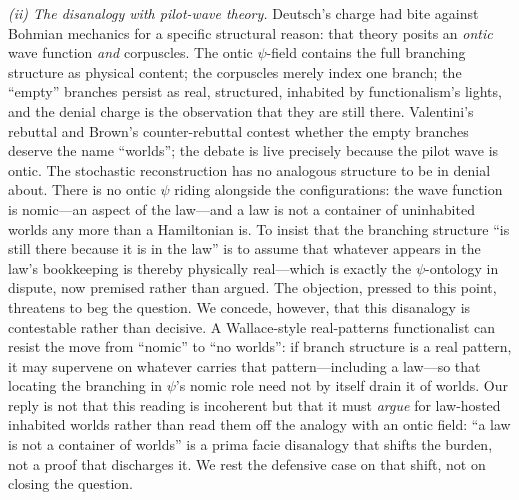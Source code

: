 \documentclass[11pt]{article}
\theoremstyle{remark}
\begin{document}
\emph{(ii) The disanalogy with pilot-wave theory.} Deutsch's charge
had bite against Bohmian mechanics for a specific structural reason:
that theory posits an \emph{ontic} wave function \emph{and}
corpuscles. The ontic $\psi$-field contains the full branching
structure as physical content; the corpuscles merely index one
branch; the ``empty'' branches persist as real, structured, inhabited
by functionalism's lights, and the denial charge is the observation
that they are still there. Valentini's rebuttal \cite{Valentini0811}
and Brown's counter-rebuttal \cite{Brown0901} contest whether the
empty branches deserve the name ``worlds''; the debate is live
precisely because the pilot wave is ontic. The stochastic
reconstruction has no analogous structure to be in denial about.
There is no ontic $\psi$ riding alongside the configurations: the
wave function is nomic---an aspect of the law---and a law is not a
container of uninhabited worlds any more than a Hamiltonian is. To
insist that the branching structure ``is still there because it is in
the law'' is to assume that whatever appears in the law's bookkeeping
is thereby physically real---which is exactly the $\psi$-ontology in
dispute, now premised rather than argued. The objection, pressed to
this point, threatens to beg the question. We concede, however, that
this disanalogy is contestable rather than decisive. A Wallace-style
real-patterns functionalist \cite{Wallace2012} can resist the move
from ``nomic'' to ``no worlds'': if branch structure is a real
pattern, it may supervene on whatever carries that pattern---including
a law---so that locating the branching in $\psi$'s nomic role need not
by itself drain it of worlds. Our reply is not that this reading is
incoherent but that it must \emph{argue} for law-hosted inhabited
worlds rather than read them off the analogy with an ontic field: ``a
law is not a container of worlds'' is a prima facie disanalogy that
shifts the burden, not a proof that discharges it. We rest the
defensive case on that shift, not on closing the question.
\end{document}

